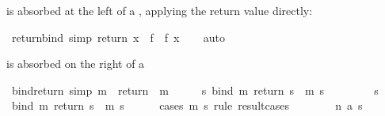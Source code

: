 \begin{isabellebody}
%
\endisadelimdocument
%
\isatagdocument
%
\isamarkuptrue%
%
\endisatagdocument
{\isafolddocument}%
%
\isadelimdocument
%
\endisadelimdocument
%
\begin{isamarkuptext}%
 is absorbed at the left of a \isa{{\isacharparenleft}{\kern0pt}{\isasymbind}{\isacharparenright}{\kern0pt}},
  applying the return value directly:%
\end{isamarkuptext}\isamarkuptrue%
\isamarkupfalse%
\ return{\isacharunderscore}{\kern0pt}bind\ {\isacharbrackleft}{\kern0pt}simp{\isacharbrackright}{\kern0pt}{\isacharcolon}{\kern0pt}\ {\isachardoublequoteopen}{\isacharparenleft}{\kern0pt}return\ x\ {\isasymbind}\ f{\isacharparenright}{\kern0pt}\ {\isacharequal}{\kern0pt}\ f\ x{\isachardoublequoteclose}\isanewline
%
\isadelimproof
\ \ %
\endisadelimproof
%
\isatagproof
{}\isamarkupfalse%
\ auto%
\endisatagproof
{\isafoldproof}%
%
\isadelimproof
%
\endisadelimproof
%
\begin{isamarkuptext}%
 is absorbed on the right of a \isa{{\isacharparenleft}{\kern0pt}{\isasymbind}{\isacharparenright}{\kern0pt}}%
\end{isamarkuptext}\isamarkuptrue%
\isamarkupfalse%
\ bind{\isacharunderscore}{\kern0pt}return\ {\isacharbrackleft}{\kern0pt}simp{\isacharbrackright}{\kern0pt}{\isacharcolon}{\kern0pt}\ {\isachardoublequoteopen}{\isacharparenleft}{\kern0pt}m\ {\isasymbind}\ return{\isacharparenright}{\kern0pt}\ {\isacharequal}{\kern0pt}\ m{\isachardoublequoteclose}\isanewline
%
\isadelimproof
%
\endisadelimproof
%
\isatagproof
{}\isamarkupfalse%
\ {\isacharminus}{\kern0pt}\isanewline
\ \ \isamarkupfalse%
\ {\isachardoublequoteopen}{\isasymforall}s{\isachardot}{\kern0pt}\ bind\ m\ return\ s\ {\isacharequal}{\kern0pt}\ m\ s{\isachardoublequoteclose}\isanewline
\ \ \isamarkupfalse%
\isanewline
\ \ \ \ \isamarkupfalse%
\ s\isanewline
\ \ \ \ \isamarkupfalse%
\ {\isachardoublequoteopen}bind\ m\ return\ s\ {\isacharequal}{\kern0pt}\ m\ s{\isachardoublequoteclose}\isanewline
\ \ \ \ \isamarkupfalse%
\ {\isacharparenleft}{\kern0pt}cases\ {\isachardoublequoteopen}m\ s{\isachardoublequoteclose}\ rule{\isacharcolon}{\kern0pt}\ result{\isacharunderscore}{\kern0pt}cases{\isacharparenright}{\kern0pt}\isanewline
\ \ \ \ \ \ \isamarkupfalse%
\ {\isacharparenleft}{\kern0pt}n\ a\ s{\isacharparenright}{\kern0pt}\isanewline
\ \ \ \ \ \ \isamarkupfalse%

\end{isabellebody}

